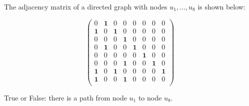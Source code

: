 \Needspace{3in}
\begin{prob}

    The adjacency matrix of a directed graph with nodes $u_1, \ldots, u_8$ is shown below:

    \[
        \begin{pmatrix}
            0 & \textbf{1} & 0 & 0 & 0 & 0 & 0 & 0 \\
            \textbf{1} & 0 & \textbf{1} & 0 & 0 & 0 & 0 & 0 \\
            0 & 0 & 0 & \textbf{1} & 0 & 0 & 0 & 0 \\
            0 & \textbf{1} & 0 & 0 & \textbf{1} & 0 & 0 & 0 \\
            0 & 0 & 0 & 0 & 0 & \textbf{1} & 0 & 0 \\
            0 & 0 & 0 & \textbf{1} & 0 & 0 & \textbf{1} & 0 \\
            \textbf{1} & 0 & \textbf{1} & 0 & 0 & 0 & 0 & \textbf{1} \\
            \textbf{1} & 0 & 0 & \textbf{1} & 0 & 0 & 0 & 0 \\
        \end{pmatrix}
    \]

    True or False: there is a path from node $u_1$ to node $u_8$.

    \Tf{}

\end{prob}

